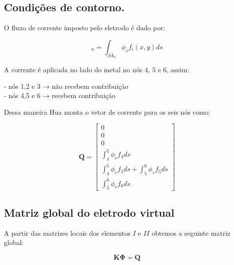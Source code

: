\documentclass[
12pt,
a4paper,
oneside,
chapter=TITLE,
sumario=tradicional
]{abntex2}
\begin{document}
\subsection{Condições de contorno.}

O fluxo de corrente imposto pelo eletrodo é dado por:

\begin{equation}
	[Q_i]_n = \int_{\partial A_n} \phi_v f_i(x,y) ds
	\label{eq:MEF_eq_0011}    
\end{equation}

A corrente é aplicada no lado do metal no nós $4$, $5$ e $6$, assim:

- nós 1,2 e 3 → não recebem contribuição\\
- nós 4,5 e 6 → recebem contribuição


Dessa maneira Hua \cite{hua1993finite} monta o vetor de corrente para os seis nós como:

$$  
 \mathbf{Q}  =
\begin{bmatrix}  
	0\\  
	0\\  
	0\\  
	\int_4^5 \phi_v f_4 ds\\  
	\int_4^5 \phi_v f_5 ds + \int_5^6 \phi_v f_5 ds\\  
	\int_5^6 \phi_v f_6 ds  
\end{bmatrix}  
$$


\subsection{Matriz global do eletrodo virtual}

A partir das matrizes locais dos elementos $I$ e $II$ obtemos a seguinte matriz global:

$$
\mathbf{K} \mathbf{\Phi} = \mathbf{Q} 
$$
\end{document}
